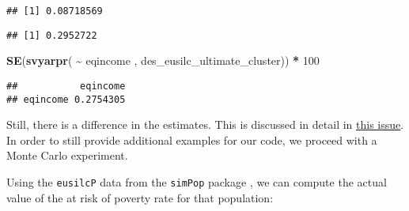 \documentclass[
]{book}
\newenvironment{Shaded}{\begin{snugshade}}{\end{snugshade}}
\newcommand{\CommentTok}[1]{\textcolor[rgb]{0.56,0.35,0.01}{\textit{#1}}}
\newcommand{\DecValTok}[1]{\textcolor[rgb]{0.00,0.00,0.81}{#1}}
\newcommand{\FunctionTok}[1]{\textcolor[rgb]{0.13,0.29,0.53}{\textbf{#1}}}
\newcommand{\NormalTok}[1]{#1}
\newcommand{\SpecialCharTok}[1]{\textcolor[rgb]{0.81,0.36,0.00}{\textbf{#1}}}
\begin{document}
\begin{verbatim}
## [1] 0.08718569
\end{verbatim}

\begin{Shaded}
\end{Shaded}

\begin{verbatim}
## [1] 0.2952722
\end{verbatim}

\begin{Shaded}
\begin{Highlighting}[]
\FunctionTok{SE}\NormalTok{(}\FunctionTok{svyarpr}\NormalTok{( }\SpecialCharTok{\textasciitilde{}}\NormalTok{ eqincome , des\_eusilc\_ultimate\_cluster)) }\SpecialCharTok{*} \DecValTok{100}
\end{Highlighting}
\end{Shaded}

\begin{verbatim}
##           eqincome
## eqincome 0.2754305
\end{verbatim}

Still, there is a difference in the estimates. This is discussed in detail in \href{https://github.com/ajdamico/convey/issues/372}{this issue}.
In order to still provide additional examples for our code, we proceed with a Monte Carlo experiment.

Using the \texttt{eusilcP} data from the \texttt{simPop} package \autocite{R-simPop}, we can compute the actual value of the at risk of poverty rate for that population:
\end{document}
